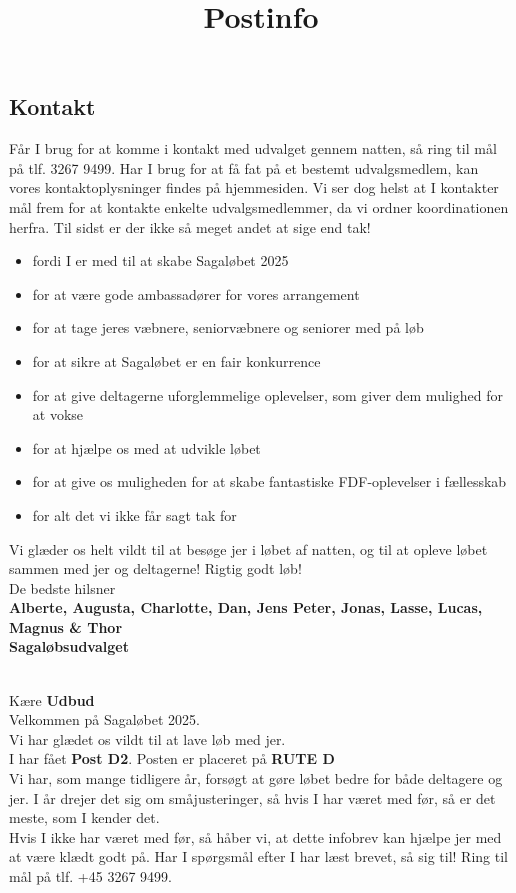 \subsection{Kontakt}
Får I brug for at komme i kontakt med udvalget gennem natten, så ring til mål på tlf. 3267 9499. Har I brug for at få fat på et bestemt udvalgsmedlem, kan vores kontaktoplysninger findes på hjemmesiden. Vi ser dog helst at I kontakter mål frem for at kontakte enkelte udvalgsmedlemmer, da vi ordner koordinationen herfra.
\newline
Til sidst er der ikke så meget andet at sige end tak!\begin{itemize}
  \item fordi I er med til at skabe Sagaløbet 2025
  \item for at være gode ambassadører for vores arrangement
  \item for at tage jeres væbnere, seniorvæbnere og seniorer med på løb
  \item for at sikre at Sagaløbet er en fair konkurrence
  \item for at give deltagerne uforglemmelige oplevelser, som giver dem mulighed for at vokse
  \item for at hjælpe os med at udvikle løbet
  \item for at give os muligheden for at skabe fantastiske FDF-oplevelser i fællesskab
  \item for alt det vi ikke får sagt tak for
\end{itemize}
Vi glæder os helt vildt til at besøge jer i løbet af natten, og til at opleve løbet sammen med jer og deltagerne!
\newline
Rigtig godt løb!\\
\newline
\textcolor{søblå}{De bedste hilsner}\\
\textcolor{natblå}{\textbf{Alberte, Augusta, Charlotte, Dan, Jens Peter, Jonas, Lasse, Lucas, Magnus \& Thor}}\\
\textcolor{natblå}{\textbf{Sagaløbsudvalget}}\\
\newpage
\title{Postinfo}\\
Kære \textbf{Udbud}\\
\newline
Velkommen på Sagaløbet 2025.\\
Vi har glædet os vildt til at lave løb med jer.\\
\newline
I har fået \textbf{Post D2}. Posten er placeret på \textbf{RUTE D}\\
Vi har, som mange tidligere år, forsøgt at gøre løbet bedre for både deltagere og jer. I år drejer det sig om småjusteringer, så hvis I har været med før, så er det meste, som I kender det.\\
\newline
Hvis I ikke har været med før, så håber vi, at dette infobrev kan hjælpe jer med at være klædt godt på. Har I spørgsmål efter I har læst brevet, så sig til! Ring til mål på tlf. +45 3267 9499.

